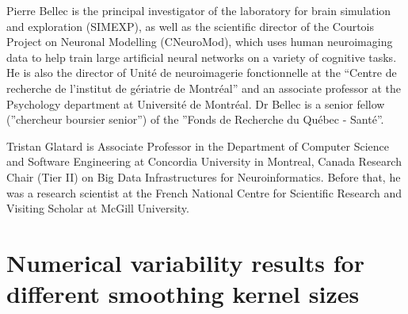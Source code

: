 \documentclass[lettersize,journal]{IEEEtran}
\begin{document}
{\begin{IEEEbiography}{Pierre Bellec}
is the principal investigator of the laboratory for brain simulation and exploration (SIMEXP), as well as the scientific director of the Courtois Project on Neuronal Modelling (CNeuroMod), which uses human neuroimaging data to help train large artificial neural networks on a variety of cognitive tasks. He is also the director of Unité de neuroimagerie fonctionnelle at the “Centre de recherche de l’institut de gériatrie de Montréal” and an associate professor at the Psychology department at Université de Montréal. Dr Bellec is a senior fellow (”chercheur boursier senior”) of the ”Fonds de Recherche du Québec - Santé”.
\end{IEEEbiography}

\begin{IEEEbiography}{Tristan Glatard} is Associate Professor in the Department of Computer Science and
  Software Engineering at Concordia University in Montreal, Canada
  Research Chair (Tier II) on Big Data Infrastructures for Neuroinformatics.
  Before that, he was a research scientist at the French National Centre for
  Scientific Research and Visiting Scholar at McGill University.
\end{IEEEbiography}

\vfill

\appendix

\section*{Numerical variability results for different smoothing kernel sizes}
\label{appendix:numerical_uncertainty}

}
\end{document}
